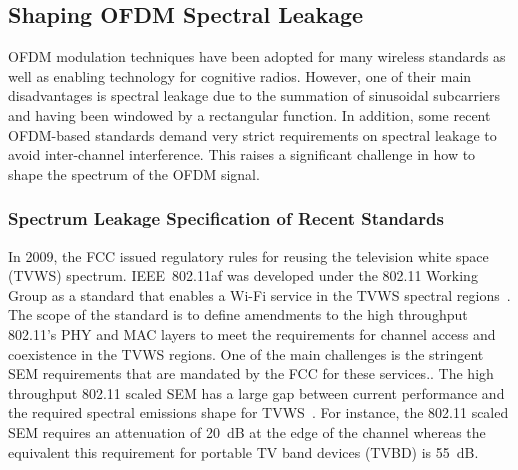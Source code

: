 \subsection{Shaping OFDM Spectral Leakage}
\label{Ch2:SpecLeak}
OFDM modulation techniques have been adopted for many wireless standards as well as enabling technology for cognitive radios.
However, one of their main disadvantages is spectral leakage due to the summation of sinusoidal subcarriers and having been windowed by a rectangular function.
In addition, some recent OFDM-based standards demand very strict requirements on spectral leakage to avoid inter-channel interference.
This raises a significant challenge in how to shape the spectrum of the OFDM signal.

\subsubsection{Spectrum Leakage Specification of Recent Standards}
In 2009, the FCC issued regulatory rules for reusing the television white space (TVWS) spectrum.
IEEE~802.11af was developed under the 802.11 Working Group as a standard that enables a Wi-Fi service in the TVWS spectral regions~\cite{802-11af2013}.
The scope of the standard is to define amendments to the high throughput 802.11's PHY and MAC layers to meet the requirements for channel access and coexistence in the TVWS regions.
One of the main challenges is the stringent SEM requirements that are mandated by the FCC for these services..
The high throughput 802.11 scaled SEM has a large gap between current performance and the required spectral emissions shape for TVWS~\cite{Shellhammer2009}.
For instance, the 802.11 scaled SEM requires an attenuation of 20~dB at the edge of the channel whereas the equivalent this requirement for portable TV band devices (TVBD) is 55~dB.

